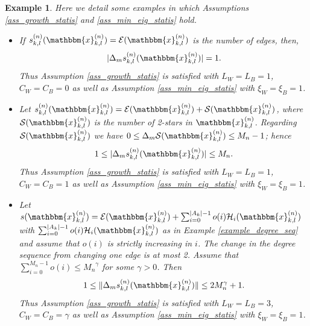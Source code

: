 \documentclass{article}
\newtheorem{Example}[Theorem]{Example}
\begin{document}
\begin{Example} 
    Here we detail some examples in which Assumptions \ref{ass_growth_statis} and \ref{ass_min_eig_statis} hold.
    \begin{itemize}
        \item[(i)] If $s_{k,l}^{(n)} (\mathbbm{x}_{k,l}^{(n)}) = \mathcal{E}(\mathbbm{x}_{k,l}^{(n)})$ is the number of edges, then,
        \begin{align*}
            \vert \Delta_m s_{k,l}^{(n)}(\mathbbm{x}_{k,l}^{(n)}) \vert =1.
        \end{align*} 
        Thus Assumption \ref{ass_growth_statis} is satisfied with $L_W=L_B=1$, $C_W=C_B=0$ as well as Assumption \ref{ass_min_eig_statis} with $\xi_W=\xi_B=1$.
        \item[(ii)] Let $s_{k,l}^{(n)} (\mathbbm{x}_{k,l}^{(n)}) = \mathcal{E}(\mathbbm{x}_{k,l}^{(n)})+ \mathcal{S}(\mathbbm{x}_{k,l}^{(n)})$, where $\mathcal{S}(\mathbbm{x}_{k,l}^{(n)})$ is the number of 2-stars in $\mathbbm{x}_{k,l}^{(n)}$. Regarding $\mathcal{S}(\mathbbm{x}_{k,l}^{(n)})$ we have $0 \leq \Delta_m \mathcal{S}(\mathbbm{x}_{k,l}^{(n)}) \leq M_n-1$; hence 
        \begin{align*}
            1 \leq \vert \Delta_m s_{k,l}^{(n)}(\mathbbm{x}_{k,l}^{(n)}) \vert \leq M_n.
        \end{align*}
         Thus Assumption \ref{ass_growth_statis} is satisfied with $L_W=L_B=1$, $C_W=C_B=1$ as well as Assumption \ref{ass_min_eig_statis} with $\xi_W=\xi_B=1$.
        \item[(iii)] Let $s(\mathbbm{x}_{k,l}^{(n)})= \mathcal{E}(\mathbbm{x}_{k,l}^{(n)}) + \sum_{i=0}^{\vert A_k\vert-1} o(i) \mathcal{H}_i(\mathbbm{x}_{k,l}^{(n)})$  with $\sum_{i=0}^{\vert A_k\vert-1} o(i) \mathcal{H}_i(\mathbbm{x}_{k,l}^{(n)})$ as in Example \ref{example_degree_seq} and assume that $o(i)$ is strictly increasing in $i$. The change in the degree sequence from changing one edge is at most 2. Assume that $\sum_{i=0}^{M_n-1} o(i) \leq {M_n}^\gamma$ for some $\gamma >0$. Then 
        \begin{align*}
            1 \leq \Vert \Delta_m s_{k,l}^{(n)}(\mathbbm{x}_{k,l}^{(n)}) \Vert 
            \leq 2 M_n^{\gamma} +1  .
        \end{align*}    
        Thus Assumption \ref{ass_growth_statis} is satisfied with $L_W=L_B=3$, $C_W=C_B=\gamma$ as well as Assumption \ref{ass_min_eig_statis} with $\xi_W=\xi_B=1$.
    \end{itemize}
\end{Example}
\end{document}
